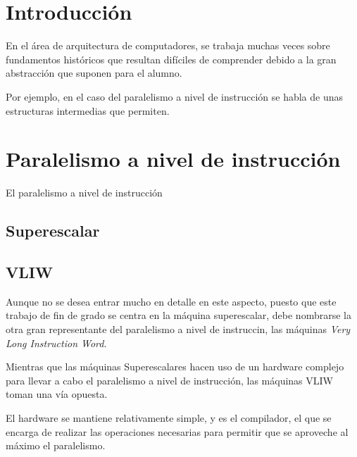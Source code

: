 
\section{Introducción}
\label{1:sec:1}

En el área de arquitectura de computadores, se trabaja muchas veces sobre fundamentos
históricos que resultan difíciles de comprender debido a la gran abstracción que suponen
para el alumno.

\bigskip
Por ejemplo, en el caso del paralelismo a nivel de instrucción se habla de unas 
estructuras intermedias que permiten.

\section{Paralelismo a nivel de instrucción}
\label{1:sec:2}

El paralelismo a nivel de instrucción 

\subsection{Superescalar}


\subsection{VLIW}

Aunque no se desea entrar mucho en detalle en este aspecto, puesto que este trabajo de 
fin de grado se centra en la máquina superescalar, debe nombrarse la otra gran 
representante del paralelismo a nivel de instruccin, las máquinas \textit{Very Long Instruction Word}.

\bigskip
Mientras que las máquinas Superescalares hacen uso de un hardware complejo para llevar
a cabo el paralelismo a nivel de instrucción, las máquinas VLIW toman una vía opuesta.

\bigskip
El hardware se mantiene relativamente simple, y es el compilador, el que se encarga
de realizar las operaciones necesarias para permitir que se aproveche al máximo el 
paralelismo.

